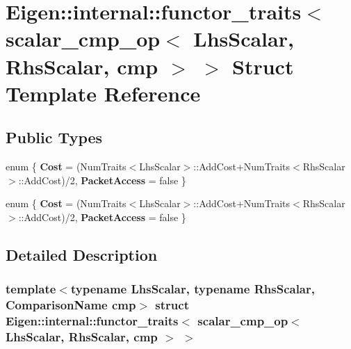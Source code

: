 \hypertarget{struct_eigen_1_1internal_1_1functor__traits_3_01scalar__cmp__op_3_01_lhs_scalar_00_01_rhs_scalar_00_01cmp_01_4_01_4}{}\section{Eigen\+:\+:internal\+:\+:functor\+\_\+traits$<$ scalar\+\_\+cmp\+\_\+op$<$ Lhs\+Scalar, Rhs\+Scalar, cmp $>$ $>$ Struct Template Reference}
\label{struct_eigen_1_1internal_1_1functor__traits_3_01scalar__cmp__op_3_01_lhs_scalar_00_01_rhs_scalar_00_01cmp_01_4_01_4}
\subsection*{Public Types}
\begin{DoxyCompactItemize}
\item 
\mbox{\label{struct_eigen_1_1internal_1_1functor__traits_3_01scalar__cmp__op_3_01_lhs_scalar_00_01_rhs_scalar_00_01cmp_01_4_01_4_a66c20096140daaf511330dc4f4926cb9}} 
enum \{ {\bfseries Cost} = (Num\+Traits$<$Lhs\+Scalar$>$\+:\+:Add\+Cost+\+Num\+Traits$<$Rhs\+Scalar$>$\+:\+:Add\+Cost)/2, 
{\bfseries Packet\+Access} = false
 \}
\item 
\mbox{\label{struct_eigen_1_1internal_1_1functor__traits_3_01scalar__cmp__op_3_01_lhs_scalar_00_01_rhs_scalar_00_01cmp_01_4_01_4_a438a4816a310277d179c584f2e342409}} 
enum \{ {\bfseries Cost} = (Num\+Traits$<$Lhs\+Scalar$>$\+:\+:Add\+Cost+\+Num\+Traits$<$Rhs\+Scalar$>$\+:\+:Add\+Cost)/2, 
{\bfseries Packet\+Access} = false
 \}
\end{DoxyCompactItemize}


\subsection{Detailed Description}
\subsubsection*{template$<$typename Lhs\+Scalar, typename Rhs\+Scalar, Comparison\+Name cmp$>$\newline
struct Eigen\+::internal\+::functor\+\_\+traits$<$ scalar\+\_\+cmp\+\_\+op$<$ Lhs\+Scalar, Rhs\+Scalar, cmp $>$ $>$}



